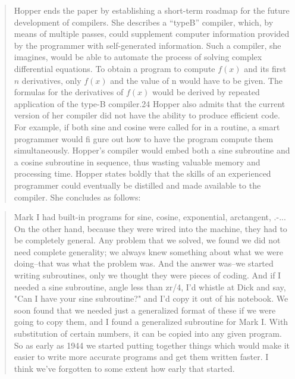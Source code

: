 \begin{quotation}
Hopper ends the paper by establishing a short-term roadmap
for the future development of compilers. She describes a “typeB” compiler, which, by means of multiple passes, could supplement computer information provided by the programmer with
self-generated information. Such a compiler, she imagines, would
be able to automate the process of solving complex differential
equations. To obtain a program to compute $f(x)$ and its first $n$
derivatives, only $f(x)$ and the value of n would have to be given.
The formulas for the derivatives of $f(x)$ would be derived by
repeated application of the type-B compiler.24
Hopper also admits that the current version of her compiler
did not have the ability to produce efficient code. For example,
if both sine and cosine were called for in a routine, a smart
programmer would fi gure out how to have the program compute them simultaneously. Hopper’s compiler would embed both
a sine subroutine and a cosine subroutine in sequence, thus
wasting valuable memory and processing time. Hopper states
boldly that the skills of an experienced programmer could eventually be distilled and made available to the compiler. She concludes as follows:
\end{quotation}

\begin{quotation}
    Mark I had built-in programs for sine, cosine, exponential, arctangent, .-... On the
other hand, because they were wired into the machine, they had to be completely general.
Any problem that we solved, we found we did not need complete generality; we always
knew something about what we were doing--that was what the problem was. And the answer was--we started writing subroutines, only we thought they were pieces of coding.
And if I needed a sine subroutine, angle less than zr/4, I'd whistle at Dick and say, "Can I
have your sine subroutine?" and I'd copy it out of his notebook. We soon found that we
needed just a generalized format of these if we were going to copy them, and I found a
generalized subroutine for Mark I. With substitution of certain numbers, it can be copied
into any given program. So as early as 1944 we started putting together things which would
make it easier to write more accurate programs and get them written faster. I think we've
forgotten to some extent how early that started.
\end{quotation}
